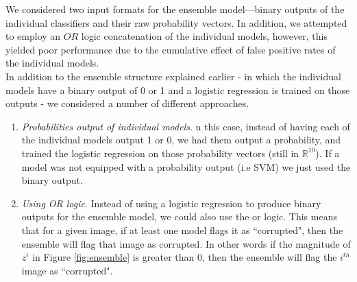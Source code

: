 
\noindent 
We considered two input formats for the ensemble model---binary outputs of the individual classifiers and their raw probability vectors. In addition, we attempted to employ an $OR$ logic concatenation of the individual models, however, this yielded poor performance due to the cumulative effect of false positive rates of the individual models.\\

\noindent 
In addition to the ensemble structure explained earlier - in which the individual models have a binary output of 0 or 1 and a logistic regression is trained on those outputs - we considered a number of different approaches.
\begin{enumerate}
    \item\textit{Probabilities output of individual models}. n this case, instead of having each of the individual models output 1 or 0, we had them output a probability, and trained the logistic regression on those probability vectors (still in $\mathbb{R}^{10}$). If a model was not equipped with a probability output (i.e SVM) we just used the binary output.
    \item\textit{Using OR logic}. Instead of using a logistic regression to produce binary outputs for the ensemble model, we could also use the or logic. This means that for a given image, if at least one model flags it as ``corrupted", then the ensemble will flag that image as corrupted. In other words if the magnitude of $z^i$ in Figure \ref{fig:ensemble} is greater than 0, then the ensemble will flag the $i^{th}$ image as ``corrupted".
\end{enumerate}

